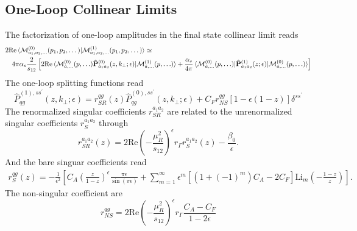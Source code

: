\documentclass[a4paper,11pt]{article}
\begin{document}
\subsection{One-Loop Collinear Limits}
The factorization of one-loop amplitudes in the final state collinear limit reads
\begin{equation}
\begin{split}
&2 \text{Re} \braket{\mathcal{M}_{a_1, a_2, \dots}^{(0)} (p_1, p_2, \dots) | \mathcal{M}^{(1)}_{a_1, a_2, \dots}(p_1, p_2, \dots)} \simeq \\
&\quad 4 \pi \alpha_s \frac{2}{s_{12}} \left[ 2 \text{Re} \braket{\mathcal{M}^{(0)}_{a, \dots} (p, \ldots) \mathbf{\hat{P}}_{a_1 a_2}^{(0)}(z, k_\perp; \epsilon) | \mathcal{M}^{(1)}_{a, \dots} (p, \ldots)} + \frac{\alpha_s}{4 \pi} \braket{\mathcal{M}^{(0)}_{a, \dots} (p, \ldots) | \mathbf{\hat{P}}_{a_1 a_2}^{(1)}(z; \epsilon) | \mathcal{M}^{(0)}_{a, \dots} (p, \ldots)} \right]
\end{split}
\end{equation}
The one-loop splitting functions read
\begin{equation}
\hat{P}_{qg}^{(1), s s^\prime} (z, k_\perp; \epsilon) = r_{SR}^{qg}(z) \hat{P}_{qg}^{(0), s s^\prime} (z, k_\perp; \epsilon) + C_F r_{NS}^{qg}  \left[1 - \epsilon (1 - z) \right] \delta^{s s^\prime}
\end{equation}
The renormalized singular coefficients $r_{SR}^{a_1 a_2}$ are related to the unrenormalized singular coefficients $r_{S}^{a_1 a_2}$ through
\begin{equation}
r_{SR}^{a_1 a_2} (z) = 2 \text{Re} \left(- \frac{\mu_R^2}{s_{12}} \right)^\epsilon r_\Gamma r_S^{a_1 a_2}(z) - \frac{\beta_0}{\epsilon}.
\end{equation}
And the bare singuar coefficients read
\begin{equation}
\begin{split}
r_{S}^{qg}(z) = -\frac{1}{\epsilon^2} \left[ C_A \left(\frac{z}{1 - z} \right)^\epsilon \frac{\pi \epsilon}{\sin (\pi \epsilon)} + \sum_{m = 1}^\infty \epsilon^m \left[ (1 + (-1)^m) C_A - 2 C_F \right] \text{Li}_m\! \left(- \frac{1 - z}{z} \right) \right].
\end{split}
\end{equation}
The non-singular coefficient are
\begin{equation}
r_{NS}^{qg} = 2 \text{Re} \left(- \frac{\mu_R^2}{s_{12}} \right)^\epsilon r_\Gamma \frac{C_A - C_F}{1 - 2 \epsilon}
\end{equation}
\end{document}

